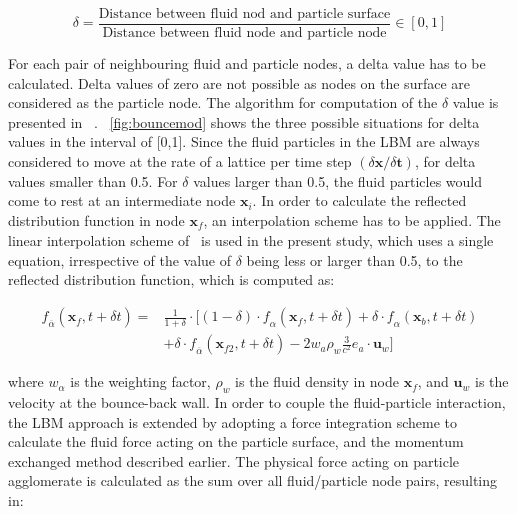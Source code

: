 \begin{equation}
\delta = \frac{\mbox{Distance between fluid nod and particle 
surface}}{\mbox{Distance between fluid node and particle node}} \in [0,1]
\end{equation} 

For each pair of neighbouring fluid and particle nodes, a delta value has to be 
calculated. Delta values of zero are not possible as nodes on the surface are 
considered as the particle node. The algorithm for computation of the $\delta$ 
value is presented in ~\citet{Iglberger2008}. ~\cref{fig:bouncemod} shows the 
three possible situations for delta values in the interval of [0,1]. Since the 
fluid particles in the LBM are always considered to move at the rate of a 
lattice per time step $(\delta \mathbf{x}/ \delta \mathbf{t})$, for delta 
values smaller than 0.5. For $\delta$ values larger than 0.5, the fluid 
particles would come to rest at an intermediate node $\mathbf{x}_{\mathit{i}}$. 
In order to calculate the reflected distribution function in node 
$\mathbf{x}_{\mathit{f}}$, an interpolation scheme has to be applied. The 
linear interpolation scheme of~\citet{Yu2003} is used in the present study, 
which uses a single equation, irrespective of the value of $\delta$ being less 
or larger than 0.5, to the reflected distribution function, which is computed 
as:

\begin{align}
 \nonumber
\mathit{\mathit{f}}_{\overline{\alpha}}(\mathbf{x}_{\mathit{f}},t + \delta t) = 
& \frac{1}{1 + \delta} \cdot [(1-\delta)\cdot 
\mathit{\mathit{f}}_{\alpha}(\mathbf{x}_{\mathit{f}},t + \delta t) + \delta 
\cdot \mathit{\mathit{f}}_{\alpha}(\mathbf{x}_{\mathit{b}},t + \delta t)  \\
& + \delta \cdot 
\mathit{\mathit{f}}_{\overline{\alpha}}(\mathbf{x}_{\mathit{f2}},t + \delta t) 
-2\mathit{w}_{\mathit{a}}\rho_{\mathit{w}}\frac{3}{\mathit{c}^{2}}\mathbf{\mathit{e}}_{\mathit{a}}\cdot
 \mathbf{u}_{\mathit{w}}]
\end{align}

where $\mathit{w}_{\alpha}$ is the weighting factor, $\rho_{\mathit{w}}$ is the 
fluid density in node $\mathbf{x}_{\mathit{f}}$, and $ \mathbf{u}_{\mathit{w}}  
$ is the velocity at the bounce-back wall. In order to couple the 
fluid-particle interaction, the LBM approach is extended by adopting a force 
integration scheme to calculate the fluid force acting on the particle surface, 
and the momentum exchanged method described earlier. The physical force acting 
on particle agglomerate is calculated as the sum over all fluid/particle node 
pairs, resulting in: 

